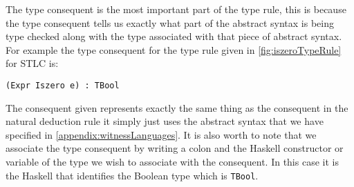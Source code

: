 The type consequent is the most important part of the type rule, this is because the type consequent tells us exactly what part of the abstract syntax is being type checked along with the type associated with that piece of abstract syntax.
For example the type consequent for the type rule given in \autoref{fig:iszeroTypeRule} for STLC is:
\begin{lstlisting}[numbers=none]
(Expr Iszero e) : TBool
\end{lstlisting}
The consequent given represents exactly the same thing as the consequent in the natural deduction rule it simply just uses the abstract syntax that we have specified in \autoref{appendix:witnessLanguages}.
It is also worth to note that we associate the type consequent by writing a colon and the Haskell constructor or variable of the type we wish to associate with the consequent.
In this case it is the Haskell that identifies the Boolean type which is \texttt{TBool}.

